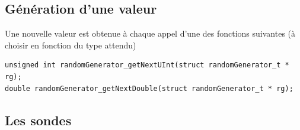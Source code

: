 %
\subsection{Génération d'une valeur}


   Une nouvelle valeur est obtenue à chaque appel d'une des fonctions
suivantes (à choisir en fonction du type attendu)

\begin{verbatim}
unsigned int randomGenerator_getNextUInt(struct randomGenerator_t * rg);
double randomGenerator_getNextDouble(struct randomGenerator_t * rg);
\end{verbatim}

%
\subsection{Les sondes}

